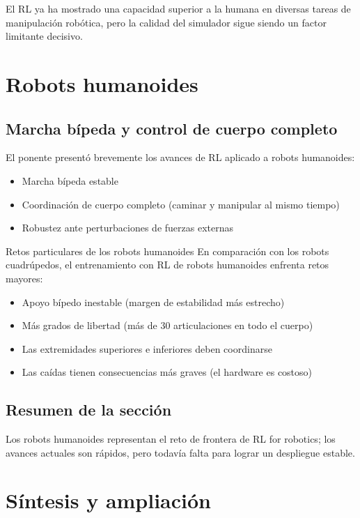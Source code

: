\documentclass[a4paper]{article}
\begin{document}
El RL ya ha mostrado una capacidad superior a la humana en diversas tareas de manipulación robótica, pero la calidad del simulador sigue siendo un factor limitante decisivo.

\section{Robots humanoides}

\subsection{Marcha bípeda y control de cuerpo completo}

El ponente presentó brevemente los avances de RL aplicado a robots humanoides:
\begin{itemize}
    \item Marcha bípeda estable
    \item Coordinación de cuerpo completo (caminar y manipular al mismo tiempo)
    \item Robustez ante perturbaciones de fuerzas externas
\end{itemize}

\begin{knowledgebox}{Retos particulares de los robots humanoides}
En comparación con los robots cuadrúpedos, el entrenamiento con RL de robots humanoides enfrenta retos mayores:
\begin{itemize}
    \item Apoyo bípedo inestable (margen de estabilidad más estrecho)
    \item Más grados de libertad (más de 30 articulaciones en todo el cuerpo)
    \item Las extremidades superiores e inferiores deben coordinarse
    \item Las caídas tienen consecuencias más graves (el hardware es costoso)
\end{itemize}
\end{knowledgebox}

\subsection{Resumen de la sección}

Los robots humanoides representan el reto de frontera de RL for robotics; los avances actuales son rápidos, pero todavía falta para lograr un despliegue estable.
\section{Síntesis y ampliación}
\end{document}
